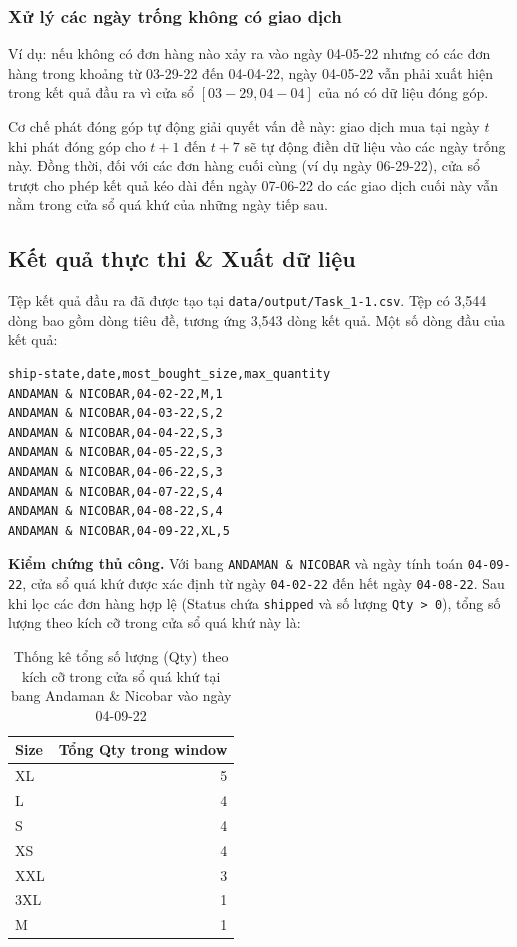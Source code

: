 \subsubsection{Xử lý các ngày trống không có giao dịch}

Ví dụ: nếu không có đơn hàng nào xảy ra vào ngày 04-05-22 nhưng có các đơn hàng trong khoảng từ 03-29-22 đến 04-04-22, ngày 04-05-22 vẫn phải xuất hiện trong kết quả đầu ra vì cửa sổ $[03-29, 04-04]$ của nó có dữ liệu đóng góp.

Cơ chế phát đóng góp tự động giải quyết vấn đề này: giao dịch mua tại ngày $t$ khi phát đóng góp cho $t+1$ đến $t+7$ sẽ tự động điền dữ liệu vào các ngày trống này. Đồng thời, đối với các đơn hàng cuối cùng (ví dụ ngày 06-29-22), cửa sổ trượt cho phép kết quả kéo dài đến ngày 07-06-22 do các giao dịch cuối này vẫn nằm trong cửa sổ quá khứ của những ngày tiếp sau.

\subsection{Kết quả thực thi \& Xuất dữ liệu}
Tệp kết quả đầu ra đã được tạo tại \texttt{data/output/Task\_1-1.csv}. Tệp có 3,544 dòng bao gồm dòng tiêu đề, tương ứng 3,543 dòng kết quả. Một số dòng đầu của kết quả:

\begin{lstlisting}[language={}]
ship-state,date,most_bought_size,max_quantity
ANDAMAN & NICOBAR,04-02-22,M,1
ANDAMAN & NICOBAR,04-03-22,S,2
ANDAMAN & NICOBAR,04-04-22,S,3
ANDAMAN & NICOBAR,04-05-22,S,3
ANDAMAN & NICOBAR,04-06-22,S,3
ANDAMAN & NICOBAR,04-07-22,S,4
ANDAMAN & NICOBAR,04-08-22,S,4
ANDAMAN & NICOBAR,04-09-22,XL,5
\end{lstlisting}

\textbf{Kiểm chứng thủ công.} Với bang \texttt{ANDAMAN \& NICOBAR} và ngày tính toán \texttt{04-09-22}, cửa sổ quá khứ được xác định từ ngày \texttt{04-02-22} đến hết ngày \texttt{04-08-22}. Sau khi lọc các đơn hàng hợp lệ (Status chứa \texttt{shipped} và số lượng \texttt{Qty > 0}), tổng số lượng theo kích cỡ trong cửa sổ quá khứ này là:

\begin{table}[H]
\centering
\begin{tabular}{lr}
\toprule
\textbf{Size} & \textbf{Tổng Qty trong window} \\
\midrule
XL & 5 \\
L & 4 \\
S & 4 \\
XS & 4 \\
XXL & 3 \\
3XL & 1 \\
M & 1 \\
\bottomrule
\end{tabular}
\caption{Thống kê tổng số lượng (Qty) theo kích cỡ trong cửa sổ quá khứ tại bang Andaman \& Nicobar vào ngày 04-09-22}
\label{tab:task1_1_manual_check}
\end{table}

